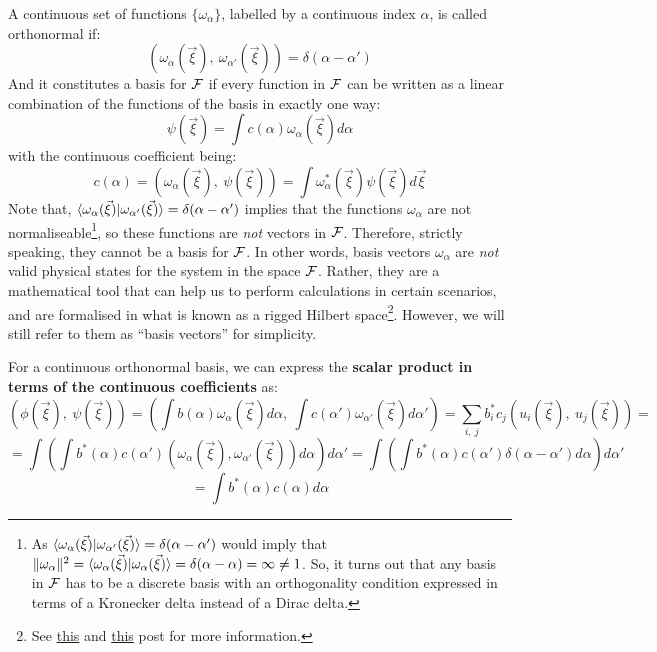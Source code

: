 \begin{definition}
    A continuous set of functions $\{\omega_\alpha\}$, labelled by a continuous index $\alpha$, is called orthonormal if:
    \begin{equation}
        \left(\omega_\alpha(\vec{\xi}), \ \omega_{\alpha'}(\vec{\xi})\right) = \delta(\alpha - \alpha')
    \end{equation}
    And it constitutes a basis for $\mathcal{F}$ if every function in $\mathcal{F}$ can be written as a linear combination of the functions of the basis in exactly one way:
    \begin{equation}
        \psi(\vec{\xi}) = \int c(\alpha) \omega_\alpha(\vec{\xi})d\alpha
    \end{equation}
    with the continuous coefficient being:
    \begin{equation}
        c(\alpha) = \left(\omega_\alpha(\vec{\xi}), \ \psi(\vec{\xi})\right) = \int \omega_\alpha^*(\vec{\xi})\psi(\vec{\xi})d\vec{\xi}
    \end{equation}   
    Note that, $\braket{\omega_\alpha(\vec{\xi})|\omega_{\alpha'}(\vec{\xi})} = \delta(\alpha - \alpha')$ implies that the functions $\omega_\alpha$ are not normaliseable\footnote{As $\braket{\omega_\alpha(\vec{\xi})|\omega_{\alpha'}(\vec{\xi})} = \delta(\alpha - \alpha')$ would imply that $\|\omega_\alpha\|^2 = \braket{\omega_\alpha(\vec{\xi})|\omega_\alpha(\vec{\xi})} = \delta(\alpha - \alpha) = \infty \neq 1$. So, it turns out that any basis in $\mathcal{F}$ has to be a discrete basis with an orthogonality condition expressed in terms of a Kronecker delta instead of a Dirac delta.}, so these functions are \textit{not} vectors in $\mathcal{F}$. Therefore, strictly speaking, they cannot be a basis for $\mathcal{F}$. In other words, basis vectors $\omega_\alpha$ are \textit{not} valid physical states for the system in the space $\mathcal{F}$.  Rather, they are a mathematical tool that can help us to perform calculations in certain scenarios, and are formalised in what is known as a rigged Hilbert space\footnote{See \href{https://physics.stackexchange.com/a/623416/283847}{this} and \href{https://physics.stackexchange.com/a/359982/283847}{this} post for more information.}. However, we will still refer to them as ``basis vectors'' for simplicity.
\end{definition}

For a continuous orthonormal basis, we can express the \textbf{scalar product in terms of the continuous coefficients} as:
\begin{equation*}
    \left(\phi(\vec{\xi}), \ \psi(\vec{\xi})\right) = \left(\int b(\alpha) \omega_\alpha(\vec{\xi})d\alpha, \ \int c(\alpha') \omega_{\alpha'}(\vec{\xi})d\alpha'\right) = \sum_{i, \ j} b^*_i c_j \left(u_i(\vec{\xi}), \ u_j(\vec{\xi})\right) = 
\end{equation*}
\begin{equation*}
    = \int\left(\int b^*(\alpha)c(\alpha') (\omega_\alpha(\vec{\xi}), \omega_{\alpha'}(\vec{\xi}))d\alpha\right) d\alpha' = \int\left(\int b^*(\alpha)c(\alpha') \delta(\alpha-\alpha') d\alpha\right) d\alpha'
\end{equation*}
\begin{equation}
    = \int b^*(\alpha)c(\alpha) d\alpha
\end{equation}


